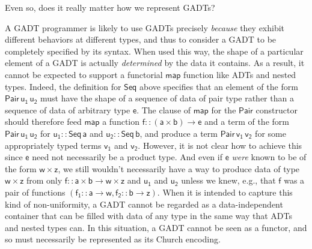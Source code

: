 \documentclass[submission,copyright,creativecommons]{eptcs}
\begin{document}
Even so, does it really matter how we represent GADTs?

A GADT programmer is likely to use GADTs precisely {\em because} they
exhibit different behaviors at different types, and thus to consider a
GADT to be completely specified by its syntax. When used this way, the
shape of a particular element of a GADT is actually {\em determined}
by the data it contains. As a result, it cannot be expected to support
a functorial $\mathsf{map}$ function like ADTs and nested
types. Indeed, the definition for $\mathsf{Seq}$ above specifies that
an element of the form $\mathsf{Pair\,u_1\,u_2}$ must have the shape
of a sequence of data of pair type rather than a sequence of data of
arbitrary type $\mathsf{e}$.  The clause of $\mathsf{map}$ for the
$\mathsf{Pair}$ constructor should therefore feed $\mathsf{map}$ a
function $\mathsf{f :: (a \times b) \to e}$ and a term of the form
$\mathsf{Pair \,u_1\,u_2}$ for $\mathsf{u_1 :: Seq\,a}$ and
$\mathsf{u_2 :: Seq\,b}$, and produce a term $\mathsf{Pair\,v_1\,v_2}$
for some appropriately typed terms $\mathsf{v_1}$ and
$\mathsf{v_2}$. However, it is not clear how to achieve this since
$\mathsf{e}$ need not necessarily be a product type. And even if
$\mathsf{e}$ {\em were} known to be of the form $\mathsf{w \times z}$,
we still wouldn't necessarily have a way to produce data of type
$\mathsf{w \times z}$ from only $\mathsf{f :: a \times b \to w \times
  z}$ and $\mathsf{u_1}$ and $\mathsf{u_2}$ unless we knew, e.g., that
$\mathsf{f}$ was a pair of functions $\mathsf{(f_1 :: a \to w, f_2 ::
  b \to z)}$. When it is intended to capture this kind of
non-uniformity, a GADT cannot be regarded as a data-independent
container that can be filled with data of any type in the same way
that ADTs and nested types can. In this situation, a GADT cannot be
seen as a functor, and so must necessarily be represented as its
Church encoding.
\end{document}

